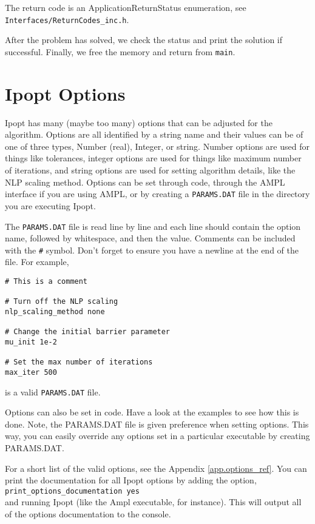 \documentclass[letter,10pt]{article}
\begin{document}
{The return code is an ApplicationReturnStatus enumeration, see {\tt
Interfaces/ReturnCodes\_inc.h}.

After the problem has solved, we check the status and print the solution if 
successful. Finally, we free the memory and return from {\tt main}.

\section{Ipopt Options}
Ipopt has many (maybe too many) options that can be adjusted for the
algorithm.  Options are all identified by a string name and their
values can be of one of three types, Number (real), Integer, or
string. Number options are used for things like tolerances, integer
options are used for things like maximum number of iterations, and
string options are used for setting algorithm details, like the NLP
scaling method. Options can be set through code, through the AMPL
interface if you are using AMPL, or by creating a {\tt PARAMS.DAT}
file in the directory you are executing Ipopt.

The {\tt PARAMS.DAT} file is read line by line and each line should
contain the option name, followed by whitespace, and then the
value. Comments can be included with the {\tt \#} symbol. Don't forget
to ensure you have a newline at the end of the file. For example,
\begin{verbatim}
# This is a comment

# Turn off the NLP scaling
nlp_scaling_method none

# Change the initial barrier parameter
mu_init 1e-2

# Set the max number of iterations
max_iter 500

\end{verbatim}
is a valid {\tt PARAMS.DAT} file.

Options can also be set in code. Have a look at the examples to see
how this is done. Note, the PARAMS.DAT file is given preference when
setting options. This way, you can easily override any options set in
a particular executable by creating PARAMS.DAT.

For a short list of the valid options, see the Appendix
\ref{app.options_ref}. You can print the documentation for all Ipopt
options by adding the option, \\ 
{\tt print\_options\_documentation yes} \\
and running Ipopt (like the Ampl executable, for instance). This will
output all of the options documentation to the console.

}
\end{document}
